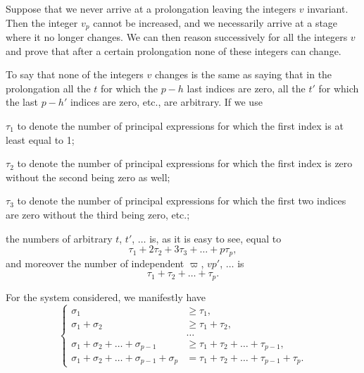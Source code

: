 \documentclass[leqno,11pt]{book}
\theoremstyle{shape1}
\theoremstyle{shapesmall}
\newcommand{\vp}{\varpi}
\newcommand{\somespace}{\vspace{9pt}}
\begin{document}
Suppose that we never arrive at a prolongation leaving the integers $v$ invariant. Then the integer $v_{p}$ cannot be increased, and we necessarily arrive at a stage where it no longer changes. We can then reason successively for all the integers $v$ and prove that after a certain prolongation none of these integers can change.

To say that none of the integers $v$ changes is the same as saying that in the prolongation all the $t$ for which the $p-h$ last indices are zero, all the $t'$ for which the last $p-h'$ indices are zero, etc., are arbitrary. If we use

\somespace

$\tau_{1}$ to denote the number of principal expressions for which the first index is at least equal to 1;

$\tau_{2}$ to denote the number of principal expressions for which the first index is zero without the second being zero as well;

$\tau_{3}$ to denote the number of principal expressions for which the first two indices are zero without the third being zero, etc.;

\somespace

the numbers of arbitrary $t$, $t'$, $\dots$ is, as it is easy to see, equal to
\begin{equation}
  \label{eq:p30}
  \tau_{1}+2\tau_{2}+3\tau_{3}+\dots+p\tau_{p},
\end{equation}
and moreover the number of independent $\vp$, $vp'$, $\dots$ is
\[
\tau_{1}+\tau_{2}+\dots+\tau_{p}.
\]

For the system considered, we manifestly have
\begin{equation}
  \label{eq:p31}
  \left\{
    \begin{aligned}
      \sigma_{1}&\ge \tau_{1},\\
      \sigma_{1}+\sigma_{2}&\ge \tau_{1}+\tau_{2},\\
      &\dots\\
      \sigma_{1}+\sigma_{2}+\dots+\sigma_{p-1}&\ge \tau_{1}+\tau_{2}+\dots+\tau_{p-1},\\
      \sigma_{1}+\sigma_{2}+\dots+\sigma_{p-1}+\sigma_{p}&= \tau_{1}+\tau_{2}+\dots+\tau_{p-1}+\tau_{p}.
    \end{aligned}
  \right.
\end{equation}
\end{document}
